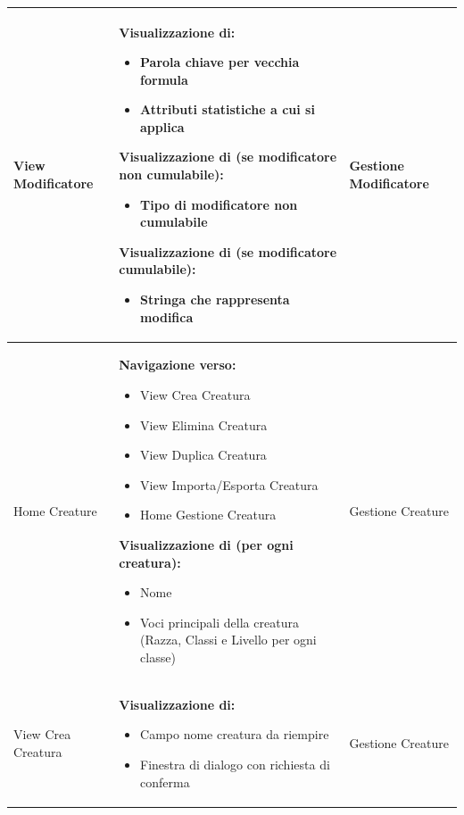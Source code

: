 \documentclass[a4paper, 11pt]{article}
\begin{document}
\begin{adjustwidth}{-1.5cm}{-1.5cm}
\begin{center}
\begin{longtable}{|p{5cm}|p{5cm}|p{5cm}|}
        View Modificatore & 
        \textbf{Visualizzazione di:}
        \begin{itemize}
            \item Parola chiave per vecchia formula
            \item Attributi statistiche a cui si applica
        \end{itemize}
        \textbf{Visualizzazione di (se modificatore non cumulabile):}
        \begin{itemize}
            \item Tipo di modificatore non cumulabile
        \end{itemize}
        \textbf{Visualizzazione di (se modificatore cumulabile):}
        \begin{itemize}
            \item Stringa che rappresenta modifica
        \end{itemize} &  Gestione Modificatore\\ \hline

        
        Home Creature & \textbf{Navigazione verso:}
        \begin{itemize}
            \item View Crea Creatura
            \item View Elimina Creatura
            \item View Duplica Creatura
            \item View Importa/Esporta Creatura
            \item Home Gestione Creatura
        \end{itemize}
        \textbf{Visualizzazione di (per ogni creatura):}
        \begin{itemize}
            \item Nome 
            \item Voci principali della creatura (Razza, Classi e Livello per ogni classe)
        \end{itemize} & Gestione Creature \\ \hline
        
        View Crea Creatura & \textbf{Visualizzazione di:}
        \begin{itemize}
            \item Campo nome creatura da riempire
            \item Finestra di dialogo con richiesta di conferma
        \end{itemize} & Gestione Creature \\ \hline
        

\end{longtable}
\end{center}
\end{adjustwidth}
\end{document}

